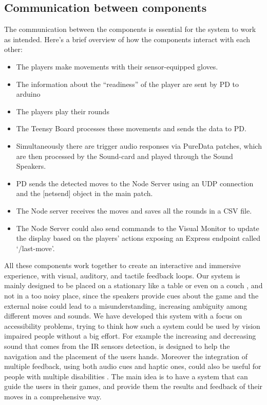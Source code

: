 \documentclass[11pt,a4paper]{report}
\begin{document}
\subsection*{Communication between components}
The communication between the components is essential for the system to work as intended. Here's a brief overview of how the components interact with each other:
\begin{itemize}
  \item The players make movements with their sensor-equipped gloves.
  \item The information about the “readiness” of the player are sent by PD to arduino
  \item The players play their rounds
  \item The Teensy Board processes these movements and sends the data to PD.
  \item Simultaneously there are trigger audio responses via PureData patches, which are then processed by the Sound-card and played through the Sound Speakers.
  \item PD sends the detected moves to the Node Server using an UDP connection and the [netsend] object in the main patch.
  \item The Node server receives the moves and saves all the rounds in a CSV file.
  \item The Node Server could also send commands to the Visual Monitor to update the display based on the players' actions exposing an Express endpoint called ‘/last-move’.
\end{itemize}

\noindent All these components work together to create an interactive and immersive experience, with visual, auditory, and tactile feedback loops.
Our system is mainly designed to be placed on a stationary like a table or even on a couch , and not in a too noisy place, since the speakers provide cues about the game and the external noise could lead to a misunderstanding, increasing ambiguity among different moves and sounds.
We have developed this system with a focus on accessibility problems, trying to think how such a system could be used by vision impaired people without a big effort.
For example the increasing and decreasing sound that comes from the IR sensors detection, is designed to help the navigation and the placement of the users hands.
Moreover the integration of multiple feedback, using both audio cues and haptic ones, could also be useful for people with multiple disabilities \cite*{2}.
The main idea is to have a system that can guide the users in their games, and provide them the results and feedback of their moves in a comprehensive way.
\end{document}
